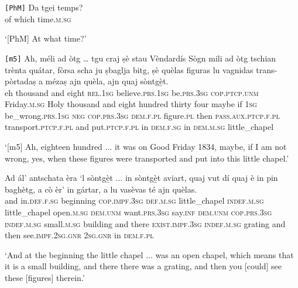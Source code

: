 \begin{linenumbers}
\gll \texttt{[PhM]} Da tgei temps?  \\
\textit{} of which time.\textsc{m.sg}   \\
\end{linenumbers}
\medskip 
\glt `[PhM] At what time?'
\medskip

\begin{linenumbers}
\gll  \texttt{[m5]} Ah, méli ad òtg … tgu craj ṣè stau Vèndardís Sògn mili ad òtg tschian trènta quátar, fòrsa scha ju ṣbaglja bitg, ṣè quèlas figuras lu vagnidas trans-pòrtadaṣ a mézaṣ ajn quèla, ajn quaj sòntgè̱t.\\
\textit{} eh thousand and eight {} \textsc{rel.1sg} believe.\textsc{prs.1sg} be.\textsc{prs.3sg} \textsc{cop.ptcp.unm} Friday.\textsc{m.sg} Holy thousand and eight hundred thirty four maybe if \textsc{1sg} be\_wrong.\textsc{prs.1sg} \textsc{neg} \textsc{cop.prs.3sg} \textsc{dem.f.pl} figure.\textsc{pl} then \textsc{pass.aux.ptcp.f.pl} transport.\textsc{ptcp.f.pl} and put.\textsc{ptcp.f.pl} in \textsc{dem.f.sg} in \textsc{dem.m.sg} little\_chapel\\
\end{linenumbers}
\medskip
\glt `[m5] Ah, eighteen hundred ... it was on Good Friday 1834, maybe,  if I am not wrong, yes, when these figures were transported and put into this little chapel.'
\medskip

\begin{linenumbers}
\gll Ad ál’ antschata èra `l sòntgè̱t ... in sòntgè̱t aviart, quaj vut dí quaj è in pin baghètg, a cò èr’ in gártar, a lu vasèvas té ajn quèlas.   \\
and in.\textsc{def.f.sg} beginning \textsc{cop.impf.3sg} \textsc{def.m.sg} little\_chapel {} \textsc{indef.m.sg} little\_chapel open.\textsc{m.sg} \textsc{dem.unm} want.\textsc{prs.3sg} say.\textsc{inf} \textsc{dem.unm} \textsc{cop.prs.3sg} \textsc{indef.m.sg} small.\textsc{m.sg} building and there \textsc{exist.impf.3sg} \textsc{indef.m.sg} grating and then see.\textsc{impf.2sg.gnr} \textsc{2sg.gnr} in \textsc{dem.f.pl}\\
\end{linenumbers}
\medskip
\glt `And at the beginning the little chapel ... was an open chapel, which means that it is a small building, and there there was a grating, and then you [could] see these [figures] therein.'
\medskip

